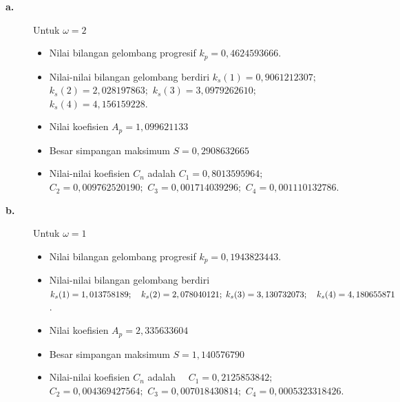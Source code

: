 \documentclass[12pt,a4paper]{report}
\begin{document}
\begin{description}
\item[\textbf{a.}]  Untuk $\omega = 2$

\begin{itemize}
\item[$\bullet$]  Nilai bilangan gelombang progresif $k_{p} = 0,4624593666$.

\item[$\bullet$]  Nilai-nilai bilangan gelombang berdiri \newline
$k_{s}(1)=0,9061212307;$ \quad $k_{s}(2)=2,028197863;$\newline
\quad $k_{s}(3)=3,0979262610;$ \quad $k_{s}(4)=4,156159228.$

\item[$\bullet$]  Nilai koefisien $A_{p} = 1,099621133$

\item[$\bullet$]  Besar simpangan maksimum $S = 0,2908632665$

\item[$\bullet$]  Nilai-nilai koefisien $C_{n}$ adalah \newline
$C_{1}=0,8013595964;$ \quad \quad $C_{2}=0,009762520190;$\newline
\quad $C_{3}=0,001714039296;$ \quad $C_{4}=0,001110132786.$
\end{itemize}

\item[\textbf{b.}]  Untuk $\omega = 1$

\begin{itemize}
\item[$\bullet$]  Nilai bilangan gelombang progresif $k_{p} = 0,1943823443$.

\item[$\bullet$]  Nilai-nilai bilangan gelombang berdiri \newline
$k_{s}(1)=1,013758189; \quad k_{s}(2)=2,078040121;\newline
\; k_{s}(3)=3,130732073; \quad k_{s}(4)=4,180655871$.\newline

\item[$\bullet$]  Nilai koefisien $A_{p} = 2,335633604$

\item[$\bullet$]  Besar simpangan maksimum $S = 1,140576790$

\item[$\bullet$]  Nilai-nilai koefisien $C_{n}$ adalah \newline
$\quad C_{1}=0,2125853842;$ \quad \quad $C_{2}=0,004369427564;$\newline
\quad $C_{3}=0,007018430814;$ \quad $C_{4}=0,0005323318426.$
\end{itemize}
\end{description}
\end{document}
